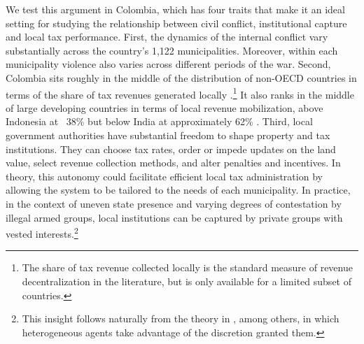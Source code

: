We test this argument in Colombia, which has four traits that make it an ideal setting for studying the relationship between civil conflict, institutional capture and local tax performance. First, the dynamics of the internal conflict vary substantially across the country's 1,122 municipalities. Moreover, within each municipality violence also varies across different periods of the war.  Second, Colombia sits roughly in the middle of the distribution of non-OECD countries in terms of the share of tax revenues generated locally \citep{deMello2000}.\footnote{The share of tax revenue collected locally is the standard measure of revenue decentralization in the literature, but is only available for a limited subset of countries.} It also ranks in the middle of large developing countries in terms of local revenue mobilization, above Indonesia at ~38\% but below India at approximately 62\% \citep{bird2012}. Third, local government authorities have substantial freedom to shape property and tax institutions. They can choose tax rates, order or impede updates on the land value, select revenue collection methods, and alter penalties and incentives. In theory, this autonomy could facilitate efficient local tax administration by allowing the system to be tailored to the needs of each municipality. In practice, in the context of uneven state presence and varying degrees of contestation by illegal armed groups, local institutions can be captured by private groups with vested interests.\footnote{This insight follows naturally from the theory in \citet{perssontabellini02a}, among others, in which heterogeneous agents take advantage of the discretion granted them.} 

